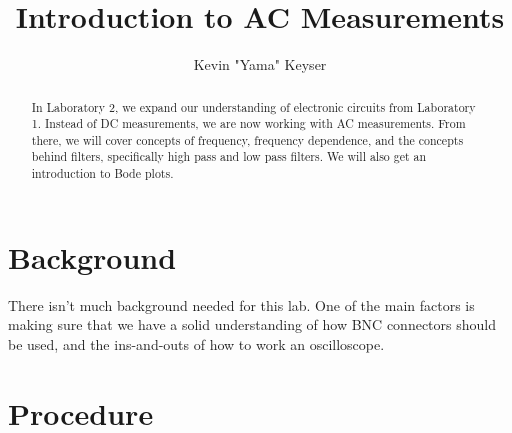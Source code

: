 \documentclass[%
 aip,
 jmp,
 amsmath,
 amssymb,
 reprint,%
 numerical,
 longbibliography,
]{revtex4-1}
\begin{document}

\title[Laboratory 2]{Introduction to AC Measurements} %

\author{Kevin "Yama" Keyser}
%


\begin{abstract}
In Laboratory 2, we expand our understanding of electronic circuits from Laboratory 1.
Instead of DC measurements, we are now working with AC measurements. From there, we 
will cover concepts of frequency, frequency dependence, and the concepts behind filters, 
specifically high pass and low pass filters. We will also get an introduction to Bode
plots.
\end{abstract}

\maketitle

%

\section{Background}

There isn't much background needed for this lab. One of the main factors is making sure
that we have a solid understanding of how BNC connectors should be used, and the
ins-and-outs of how to work an oscilloscope. 

\section{Procedure}
\end{document}
